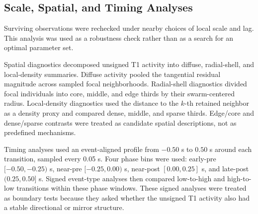\subsection{Scale, Spatial, and Timing Analyses}

Surviving observations were rechecked under nearby choices of local scale and
lag. This analysis was used as a robustness check rather than as a search for
an optimal parameter set.

Spatial diagnostics decomposed unsigned T1 activity into diffuse,
radial-shell, and local-density summaries. Diffuse activity pooled the
tangential residual magnitude across sampled focal neighborhoods. Radial-shell
diagnostics divided focal individuals into core, middle, and edge thirds by
their swarm-centered radius. Local-density diagnostics used the distance to
the $k$-th retained neighbor as a density proxy and compared dense, middle,
and sparse thirds. Edge/core and dense/sparse contrasts were treated as
candidate spatial descriptions, not as predefined mechanisms.

Timing analyses used an event-aligned profile from $-0.50$ s to $0.50$ s
around each transition, sampled every 0.05 s. Four phase bins were used:
early-pre $[-0.50,-0.25)$ s, near-pre $[-0.25,0.00)$ s, near-post
$[0.00,0.25]$ s, and late-post $(0.25,0.50]$ s. Signed event-type analyses
then compared low-to-high and high-to-low transitions within these phase
windows. These signed analyses were treated as boundary tests because they
asked whether the unsigned T1 activity also had a stable directional or mirror
structure.
